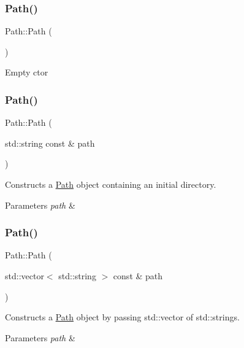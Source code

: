 \subsubsection{\texorpdfstring{Path()}{Path()}\hspace{0.1cm}{\footnotesize\ttfamily [1/3]}}
{\footnotesize\ttfamily Path\+::\+Path (\begin{DoxyParamCaption}{ }\end{DoxyParamCaption})}

Empty c\textquotesingle{}tor \mbox{\label{class_path_ae560f045f52d39eacdac15ec28b0b8b8}} 
\subsubsection{\texorpdfstring{Path()}{Path()}\hspace{0.1cm}{\footnotesize\ttfamily [2/3]}}
{\footnotesize\ttfamily Path\+::\+Path (\begin{DoxyParamCaption}\item[{std\+::string const \&}]{path }\end{DoxyParamCaption})}

Constructs a \mbox{\hyperlink{class_path}{Path}} object containing an initial directory. 
\begin{DoxyParams}{Parameters}
{\em path} & \\
\hline
\end{DoxyParams}
\mbox{\label{class_path_ab8cc1ce5a7c3f79bb5e730fd847c846e}} 
\subsubsection{\texorpdfstring{Path()}{Path()}\hspace{0.1cm}{\footnotesize\ttfamily [3/3]}}
{\footnotesize\ttfamily Path\+::\+Path (\begin{DoxyParamCaption}\item[{std\+::vector$<$ std\+::string $>$ const \&}]{path }\end{DoxyParamCaption})}

Constructs a \mbox{\hyperlink{class_path}{Path}} object by passing std\+::vector of std\+::strings. 
\begin{DoxyParams}{Parameters}
{\em path} & \\
\hline
\end{DoxyParams}


